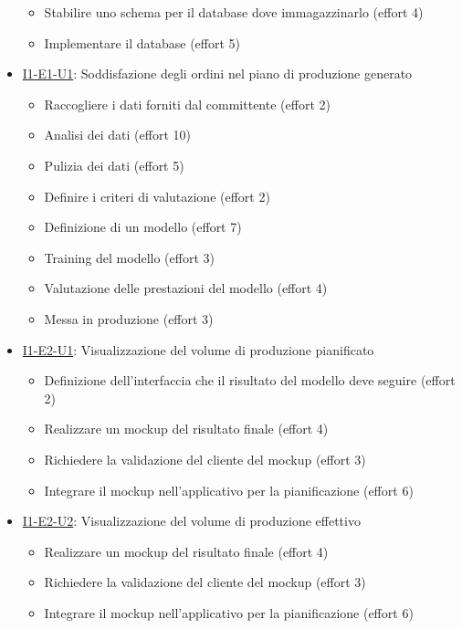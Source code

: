 \begin{itemize}
\begin{itemize}
          \item Stabilire uno schema per il database dove immagazzinarlo (effort 4)
          \item Implementare il database (effort 5)
        \end{itemize}
  \item \hyperref[user-story:i1-e1-u1]{I1-E1-U1}: Soddisfazione degli ordini nel piano di produzione generato
        \begin{itemize}
          \item Raccogliere i dati forniti dal committente (effort 2)
          \item Analisi dei dati (effort 10)
          \item Pulizia dei dati (effort 5)
          \item Definire i criteri di valutazione (effort 2)
          \item Definizione di un modello (effort 7)
          \item Training del modello (effort 3)
          \item Valutazione delle prestazioni del modello (effort 4)
          \item Messa in produzione (effort 3)
        \end{itemize}
  \item \hyperref[user-story:i1-e2-u1]{I1-E2-U1}: Visualizzazione del volume di produzione pianificato
        \begin{itemize}
          \item Definizione dell'interfaccia che il risultato del modello deve seguire (effort 2)
          \item Realizzare un mockup del risultato finale (effort 4)
          \item Richiedere la validazione del cliente del mockup (effort 3)
          \item Integrare il mockup nell'applicativo per la pianificazione (effort 6)
        \end{itemize}
  \item \hyperref[user-story:i1-e2-u2]{I1-E2-U2}: Visualizzazione del volume di produzione effettivo
        \begin{itemize}
          \item Realizzare un mockup del risultato finale (effort 4)
          \item Richiedere la validazione del cliente del mockup (effort 3)
          \item Integrare il mockup nell'applicativo per la pianificazione (effort 6)

\end{itemize}
\end{itemize}
